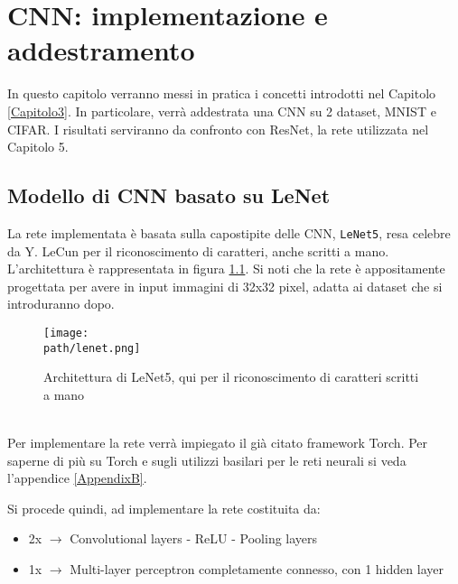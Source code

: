 \chapter{CNN: implementazione e addestramento} %
\label{Capitolo4}
\def \path	 {Figures/C4}
In questo capitolo verranno messi in pratica i concetti introdotti nel Capitolo \ref{Capitolo3}. In particolare, verrà addestrata una CNN su 2 dataset, MNIST e CIFAR. I risultati serviranno da confronto con ResNet, la rete utilizzata nel Capitolo 5. 
\section{Modello di CNN basato su LeNet}
La rete implementata è basata sulla capostipite delle CNN, \texttt{LeNet5}, resa celebre da Y. LeCun per il riconoscimento di caratteri, anche scritti a mano\parencite{lenet}.  L'architettura è rappresentata in figura \ref{fig:lenet}. Si noti che la rete è appositamente progettata per avere in input immagini di 32x32 pixel, adatta ai dataset che si introduranno dopo. 
\begin{figure}[h!]
 \centering
 \texttt{[image: \\path/lenet.png]} 
 \caption{Architettura di LeNet5, qui per il riconoscimento di caratteri scritti a mano}
 \label{fig:lenet}
\end{figure}	\\
Per implementare la rete verrà impiegato il già citato framework Torch. Per saperne di più su Torch e sugli utilizzi basilari per le reti neurali si veda l'appendice \ref{AppendixB}.

Si procede quindi, ad implementare la rete costituita da: 
\begin{itemize}
\item 2x $\rightarrow$ Convolutional layers - ReLU - Pooling layers
\item 1x $\rightarrow$ Multi-layer perceptron completamente connesso, con 1 hidden layer 
\end{itemize}


